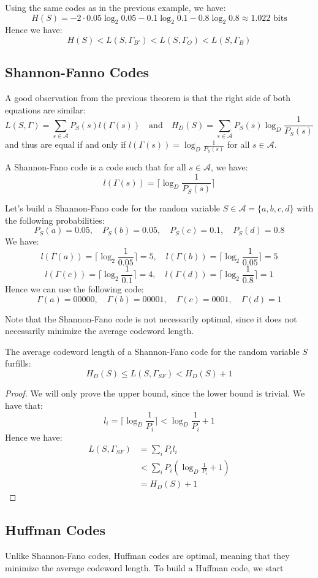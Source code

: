 \begin{eg}
    Using the same codes as in the previous example, we have:
    \[
        H(S) = -2 \cdot 0.05 \log_2 0.05 - 0.1 \log_2 0.1 - 0.8 \log_2 0.8 \approx 1.022 \text{ bits}
    \]
    Hence we have:
    \[
        H(S) < L(S, \Gamma_{B'}) < L(S, \Gamma_O) < L(S, \Gamma_B)
    \]
\end{eg}

\subsection{Shannon-Fanno Codes}
A good observation from the previous theorem is that the right side of both equations are similar:
\[
    L(S, \Gamma) = \sum_{s \in \mathcal{A}} P_S(s) l(\Gamma(s)) \quad \text{and} \quad H_D(S) = \sum_{s \in \mathcal{A}} P_S(s) \log_D \frac{1}{P_S(s)}
\]
and thus are equal if and only if $l(\Gamma(s)) = \log_D \frac{1}{P_S(s)}$ for all $s \in \mathcal{A}$.

\begin{definition}
    A Shannon-Fano code is a code such that for all $s \in \mathcal{A}$, we have:
    \[
        l(\Gamma(s)) = \lceil \log_D \frac{1}{P_S(s)} \rceil
    \]
\end{definition}

\begin{eg}
    Let's build a Shannon-Fano code for the random variable $S \in \mathcal{A} = \{a,b,c,d\}$ with the following probabilities:
    \[
        P_S(a) = 0.05, \quad P_S(b) = 0.05, \quad P_S(c) = 0.1, \quad P_S(d) = 0.8
    \]
    We have:
    \[
        l(\Gamma(a)) = \lceil \log_2 \frac{1}{0.05} \rceil = 5, \quad l(\Gamma(b)) = \lceil \log_2 \frac{1}{0.05} \rceil = 5
    \]
    \[
        l(\Gamma(c)) = \lceil \log_2 \frac{1}{0.1} \rceil = 4, \quad l(\Gamma(d)) = \lceil \log_2 \frac{1}{0.8} \rceil = 1
    \]
    Hence we can use the following code:
    \[
        \Gamma(a) = 00000, \quad \Gamma(b) = 00001, \quad \Gamma(c) = 0001, \quad \Gamma(d) = 1
    \]
\end{eg}
Note that the Shannon-Fano code is not necessarily optimal, since it does not necessarily minimize the average codeword length.

\begin{theorem}
    The average codeword length of a Shannon-Fano code for the random variable $S$ furfills:
    \[
        H_D(S) \leq L(S, \Gamma_{SF}) < H_D(S) + 1
    \]
\end{theorem}
\begin{proof}
    We will only prove the upper bound, since the lower bound is trivial. We have that:
    \[
        l_i = \lceil \log_D \frac{1}{P_i} \rceil < \log_D \frac{1}{P_i} + 1
    \]
    Hence we have:
    \begin{align*}
        L(S, \Gamma_{SF}) &= \sum_{i} P_i l_i \\
        &< \sum_{i} P_i \left(\log_D \frac{1}{P_i} + 1\right) \\
        &= H_D(S) + 1
    \end{align*}
\end{proof}

\subsection{Huffman Codes}
Unlike Shannon-Fano codes, Huffman codes are optimal, meaning that they minimize the average codeword length. To build a Huffman code, we start